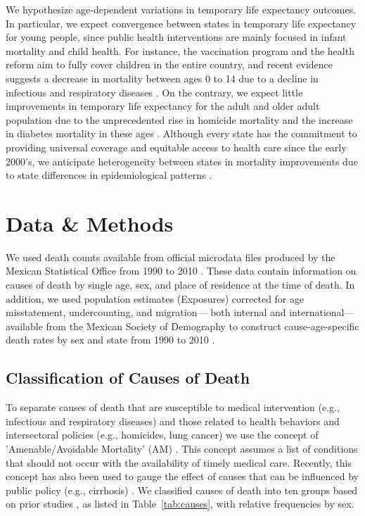 \documentclass{article}
\begin{document}
We hypothesize age-dependent variations in temporary life expectancy outcomes.
In particular, we expect convergence between states in temporary life expectancy
for young people, since public health interventions are mainly focused in infant
mortality and child health. For instance, the vaccination program and the health
reform aim to fully cover children in the entire country, and recent
evidence suggests a decrease in mortality between ages 0 to 14 due to a decline
in infectious and respiratory diseases \citep{canudas2014}. On the contrary, we
expect little improvements in temporary life expectancy for the adult and older
adult population due to the unprecedented rise in homicide mortality and the
increase in diabetes mortality in these ages \citep{canudas2014}. Although every
state has the commitment to providing universal coverage and equitable access to
health care since the early 2000's, we anticipate heterogeneity between states
in mortality improvements due to state differences in epidemiological patterns
\citep{Frenk2006}.


\section*{Data \& Methods} 
 
We used death counts available from official microdata files produced by the
Mexican Statistical Office from 1990 to 2010 \citep{INEGI}. These data contain
information on causes of death by single age, sex, and place of residence at the
time of death. In addition, we used population estimates (Exposures) corrected
for age misstatement, undercounting, and migration--- both internal and
international--- available from the Mexican Society of Demography to construct
cause-age-specific death rates by sex and state from 1990 to 2010 \citep{SOMEDE}.

\subsection*{Classification of Causes of Death}

To separate causes of death that are susceptible to medical intervention (e.g.,
infectious and respiratory diseases) and those related to health behaviors and
intersectoral policies (e.g., homicides, lung cancer) we use the concept of
'Amenable/Avoidable Mortality' (AM) \citep{nolte&mckee2004, nolte&mckee2008}. This
concept assumes a list of conditions that should not occur with the availability
of timely medical care. Recently, this concept has also been used to gauge the
effect of causes that can be influenced by public policy (e.g., cirrhosis) \citep{elo2014}. We classified causes of death into ten groups based on prior studies
\citep{elo2014, Aburto2015}, as listed in Table~\ref{tab:causes}, with
relative frequencies by sex.
\end{document}

